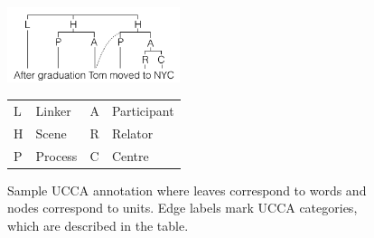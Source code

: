 \documentclass[11pt]{article}
\begin{document}
%


\begin{figure}
    \begin{center}
    \includegraphics[width=0.45\textwidth]{ucca-tree-v2.png}

\begin{tabular}{|l|l|l|l|}
\hline
L & Linker &  A & Participant \\
H & Scene & R & Relator \\
P & Process & C & Centre \\
\hline
\end{tabular}
    \end{center}
\caption{\label{fig:ucca_example_v2}
  Sample UCCA annotation where leaves correspond to words and nodes correspond to units.
  Edge labels mark UCCA categories, which are described in the table.}
\end{figure}
\end{document}

